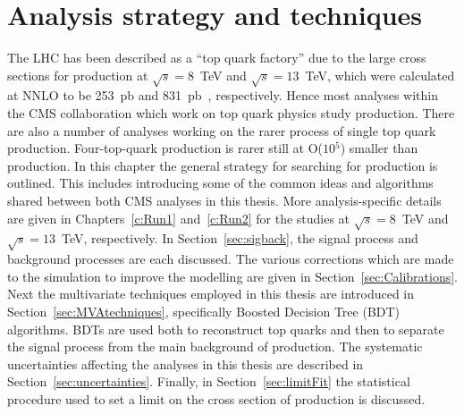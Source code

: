 \chapter{Analysis strategy and techniques \label{c:ana}}


The LHC has been described as a ``top quark factory'' due to the large cross sections for \ttbar production at $\sqrt{s}=8$~TeV and $\sqrt{s}=13$~TeV, which were calculated at NNLO to be 253~pb and 831~pb~\cite{PhysRevLett.110.252004,Czakon20142930}, respectively. Hence most analyses within the CMS collaboration which work on top quark physics study \ttbar production. There are also a number of analyses working on the rarer process of single top quark production. Four-top-quark production is rarer still at O($10{^5}$) smaller than \ttbar production. 
In this chapter the general strategy for searching for \tttt production is outlined. This includes introducing some of the common ideas and algorithms shared between both CMS \tttt analyses in this thesis. More analysis-specific details are given in Chapters~\ref{c:Run1} and~\ref{c:Run2} for the studies at $\sqrt{s}=8$~TeV and $\sqrt{s}=13$~TeV, respectively. In Section~\ref{sec:sigback}, the signal \tttt process and background processes are each discussed. The various corrections which are made to the simulation to improve the modelling are given in Section~\ref{sec:Calibrations}. Next the multivariate techniques employed in this thesis are introduced in Section~\ref{sec:MVAtechniques}, specifically Boosted Decision Tree (BDT) algorithms. BDTs are used both to reconstruct top quarks and then to separate the signal \tttt process from the main background of \ttbar production. The systematic uncertainties affecting the analyses in this thesis are described in Section~\ref{sec:uncertainties}. Finally, in Section~\ref{sec:limitFit} the statistical procedure used to set a limit on the cross section of \tttt production is discussed.

